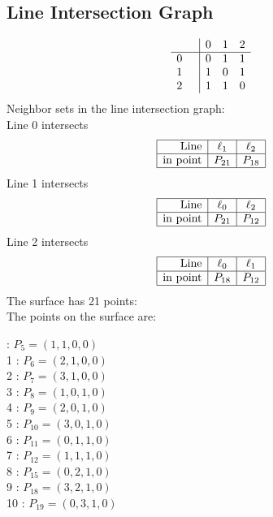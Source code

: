\documentclass{article}
\begin{document}
{\subsection*{Line Intersection Graph}
{\arraycolsep=1pt
$$
\begin{array}{rr|*{3}r}
 &  & 0 & 1 & 2\\
\hline
0 &  & 0 & 1 & 1\\
1 &  & 1 & 0 & 1\\
2 &  & 1 & 1 & 0\\
\end{array}
$$
}%
Neighbor sets in the line intersection graph:\\
Line 0 intersects 
$$
\begin{array}{|r*{2}{|c}|}
\hline
\mbox{Line}  & \ell_{1} & \ell_{2}\\
\hline
\mbox{in point}  & P_{21} & P_{18}\\
\hline
\end{array}
$$
Line 1 intersects 
$$
\begin{array}{|r*{2}{|c}|}
\hline
\mbox{Line}  & \ell_{0} & \ell_{2}\\
\hline
\mbox{in point}  & P_{21} & P_{12}\\
\hline
\end{array}
$$
Line 2 intersects 
$$
\begin{array}{|r*{2}{|c}|}
\hline
\mbox{Line}  & \ell_{0} & \ell_{1}\\
\hline
\mbox{in point}  & P_{18} & P_{12}\\
\hline
\end{array}
$$
The surface has 21 points:\\
The points on the surface are:\\
\begin{multicols}{3}
 : $P_{5}=( 1, 1, 0, 0 )$\\
1 : $P_{6}=( 2, 1, 0, 0 )$\\
2 : $P_{7}=( 3, 1, 0, 0 )$\\
3 : $P_{8}=( 1, 0, 1, 0 )$\\
4 : $P_{9}=( 2, 0, 1, 0 )$\\
5 : $P_{10}=( 3, 0, 1, 0 )$\\
6 : $P_{11}=( 0, 1, 1, 0 )$\\
7 : $P_{12}=( 1, 1, 1, 0 )$\\
8 : $P_{15}=( 0, 2, 1, 0 )$\\
9 : $P_{18}=( 3, 2, 1, 0 )$\\
10 : $P_{19}=( 0, 3, 1, 0 )$\\

\end{multicols}}
\end{document}
